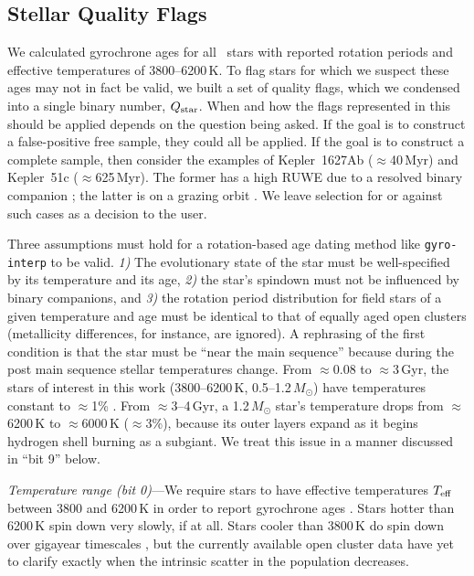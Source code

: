\documentclass[11pt,twocolumn,tighten]{aastex63}
\begin{document}
\subsection{Stellar Quality Flags}
\label{subsec:flags}
We calculated gyrochrone ages for all \nuniqstarsantosrotteffcut\
stars with reported rotation periods and effective temperatures of
3800--6200\,K.  To flag stars for which we suspect these ages may not
in fact be valid, we built a set of quality flags, which we condensed
into a single binary number, $Q_{\rm star}$.  When and how the flags
represented in this should be applied depends on the question being
asked.  If the goal is to construct a false-positive free sample, they
could all be applied.  If the goal is to construct a complete sample,
then consider the examples of Kepler~1627Ab ($\approx$40\,Myr) and
Kepler~51c ($\approx$625\,Myr).  The former has a high RUWE due to a
resolved binary companion \citep{Bouma_2022a}; the latter is on a
grazing orbit \citep{2014ApJ...783...53M}.  We leave selection for or
against such cases as a decision to the user.

Three assumptions must hold for a rotation-based age dating method
like \texttt{gyro-interp} to be valid.  {\it 1)} The evolutionary
state of the star must be well-specified by its temperature and its
age, {\it 2)} the star's spindown must not be influenced by binary
companions, and {\it 3)} the rotation period distribution for field
stars of a given temperature and age must be identical to that of
equally aged open clusters (metallicity differences, for instance, are
ignored).  A rephrasing of the first condition is that the star must
be ``near the main sequence'' because during the post main sequence
stellar temperatures change.  From $\approx$0.08 to $\approx$3\,Gyr,
the stars of interest in this work (3800--6200\,K,
0.5--1.2\,$M_\odot$) have temperatures constant to $\approx$1\%
\citep{Choi_2016}.  From $\approx$3--4\,Gyr, a 1.2\,$M_\odot$ star's
temperature drops from $\approx$6200\,K to $\approx$6000\,K
($\approx$3\%), because its outer layers expand as it begins hydrogen
shell burning as a subgiant.  We treat this issue in a manner
discussed in ``bit 9'' below.

{\it Temperature range (bit 0)}---We require stars to have effective
temperatures $T_{\rm eff}$ between 3800 and 6200\,K in order to report
gyrochrone ages \citep{Bouma_2023}.   Stars hotter than 6200\,K spin
down very slowly, if at all.  Stars cooler than 3800\,K do spin down
over gigayear timescales
\citep{2016ApJ...821...93N,2023ApJ...954L..50E,2024arXiv240312129C},
but the currently available open cluster data have yet to clarify
exactly when the intrinsic scatter in the population decreases.
\end{document}
